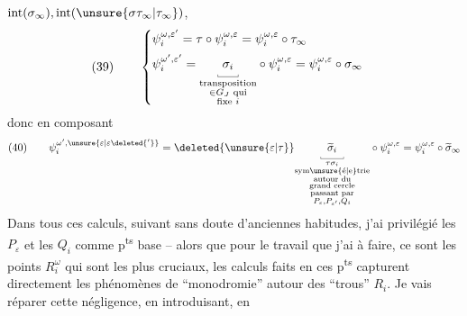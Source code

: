$\operatorname{int}(\sigma_\infty),\operatorname{int}(\unsure{\sigma\tau_\infty|\tau_\infty})$,
\[
(39)\qquad\begin{cases}
\psi_i^{\omega,\varepsilon'}=\tau\circ\psi_i^{\omega,\varepsilon}=\psi_i^{\omega,\varepsilon}\circ\tau_\infty\\[5pt]
\psi_i^{\omega',\varepsilon'}=\underset{\substack{\text{transposition}\\\in G_J\text{ qui}\\\text{fixe }i}}{\underset{\rule{0.3pt}{0.45ex}\rule{1.6em}{0.3pt}\rule{0.3pt}{0.45ex}}{\sigma_i}}\circ\psi_i^{\omega,\varepsilon}=\psi_i^{\omega,\varepsilon}\circ\sigma_\infty
\end{cases}
\]
donc en composant
\[
(40)\qquad\psi_i^{\omega',\unsure{\varepsilon|\varepsilon\deleted{'}}}=\deleted{\unsure{\varepsilon|\tau}}\underset{\substack{\tau\sigma_i\\\text{sym\unsure{é|e}trie}\\\text{autour du}\\\text{grand cercle}\\\text{passant par}\\P_\varepsilon,P_{\varepsilon'},Q_i}}{\underset{\rule{0.3pt}{0.45ex}\rule{2.1em}{0.3pt}\rule{0.3pt}{0.45ex}}{\widetilde\sigma_i}}\circ\psi_i^{\omega,\varepsilon}=\psi_i^{\omega,\varepsilon}\circ\widetilde\sigma_\infty
\]
Dans tous ces calculs, suivant sans doute d'anciennes habitudes, j'ai privilégié les $P_\varepsilon$ et les $Q_i$ comme p\textsuperscript{ts} base -- alors que pour le travail que j'ai à faire, ce sont les points $R_i^\omega$ qui sont les plus cruciaux,  les calculs faits en ces p\textsuperscript{ts} capturent directement les phénomènes de ``monodromie'' autour des ``trous'' $R_i$. Je vais réparer cette négligence, en introduisant, en

